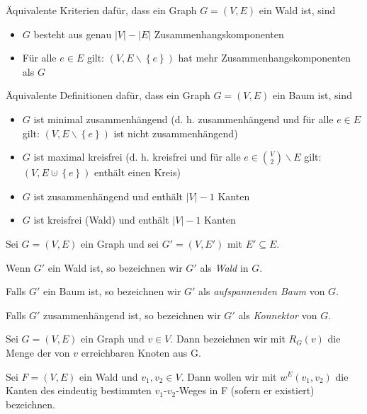 \documentclass[10p,a4paper,BCOR = 12mm, DIV=15]{scrbook}
\begin{document}
\begin{Bem}
Äquivalente Kriterien dafür, dass ein Graph $G=(V, E)$ ein Wald ist, sind
\begin{itemize}
\item $G$ besteht aus genau $\left|V\right| - \left|E\right|$ Zusammenhangskomponenten
\item Für alle $e \in E$ gilt: $(V, E \backslash \left\{e\right\})$ hat mehr Zusammenhangskomponenten als $G$
\end{itemize}
Äquivalente Definitionen dafür, dass ein Graph $G=(V, E)$ ein Baum ist, sind
\begin{itemize}
\item $G$ ist minimal zusammenhängend (d. h. zusammenhängend und für alle $e\in E$ gilt: \linebreak $(V, E \backslash \left\{e\right\})$ ist nicht zusammenhängend)
\item $G$ ist maximal kreisfrei (d. h. kreisfrei und für alle $e\in {V \choose 2} \backslash E$ gilt: $(V, E \cupdot \left\{e\right\})$ enthält einen Kreis)
\item $G$ ist zusammenhängend und enthält $\left|V\right|-1$ Kanten
\item $G$ ist kreisfrei (Wald) und enthält $\left|V\right|-1$ Kanten
\end{itemize}
\end{Bem}

\begin{Def}
Sei $G=\left(V, E\right)$ ein Graph und sei $G'=\left(V, E'\right)$ mit $E' \subseteq E$.

Wenn $G'$ ein Wald ist, so bezeichnen wir $G'$ als \emph{Wald} in $G$.

Falls $G'$ ein Baum ist, so bezeichnen wir $G'$ als \emph{aufspannenden Baum} von $G$.

Falls $G'$ zusammenhängend ist, so bezeichnen wir $G'$ als \emph{Konnektor} von $G$.
\end{Def}

\begin{Def}
\label{def:erreichbar_weg}
Sei $G=(V, E)$ ein Graph und $v\in V$. Dann bezeichnen wir mit $R_G(v)$ die Menge der von $v$ erreichbaren Knoten aus G.
\end{Def}

\begin{Def}
\label{def:kanten_weg}
Sei $F=(V, E)$ ein Wald und $v_1, v_2 \in V$. Dann wollen wir mit $w^E\left(v_1, v_2\right)$ die Kanten des eindeutig bestimmten $v_1$-$v_2$-Weges in F (sofern er existiert) bezeichnen.
\end{Def}
\end{document}
